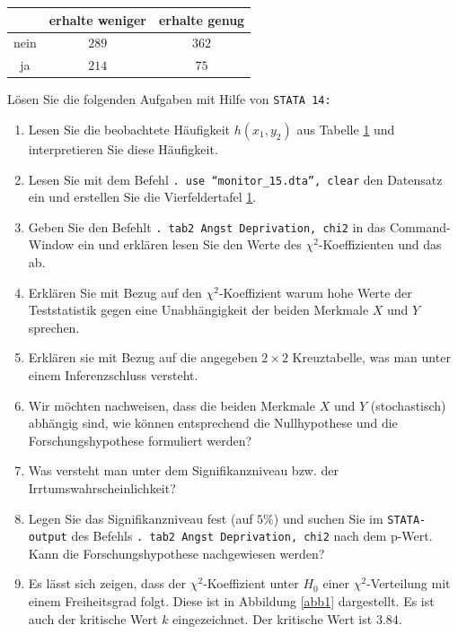 \documentclass[11pt]{article}
\begin{document}
\begin{enumerate}
\begin{table}[ht]
\begin{center}
\begin{tabular}{|c|c|c|}
	\hline %
             & erhalte weniger   & erhalte genug  \\ \hline
        nein & $289$  & $362$                  \\ \hline
          ja & $214$  & $75$        \\ \hline
\end{tabular}
\end{center}
\label{depri_angst}
\end{table}
Lösen Sie die folgenden Aufgaben mit Hilfe von  \texttt{STATA 14:}
\begin{enumerate}
\item{Lesen Sie die beobachtete Häufigkeit $h(x_{1},y_{2})$ aus Tabelle \ref{depri_angst}
und interpretieren Sie diese Häufigkeit.}
 \item {Lesen Sie mit dem Befehl \texttt{. use ``monitor\_15.dta'', clear} den Datensatz ein und erstellen  Sie die Vierfeldertafel \ref{depri_angst}.}
 \item{Geben Sie den Befehlt \texttt{. tab2 Angst Deprivation, chi2} in das Command-Window ein
 und erklären lesen Sie den Werte des $\chi^{2}$-Koeffizienten und das  ab.}
 \item{ Erklären Sie mit Bezug auf den $\chi^{2}$-Koeffizient warum hohe Werte
 der Teststatistik gegen eine Unabhängigkeit der beiden
 Merkmale $X$ und $Y$ sprechen.}
 \item{Erklären sie mit Bezug auf die angegeben $2 \times 2$ Kreuztabelle, was man unter einem Inferenzschluss versteht. }
 \item{Wir möchten nachweisen, dass die beiden Merkmale $X$ und $Y$ (stochastisch) abhängig sind, wie können entsprechend die Nullhypothese
 und die Forschungshypothese formuliert werden?}%
 \item{Was versteht man unter dem Signifikanzniveau bzw. der Irrtumswahrscheinlichkeit?}
 \item{Legen Sie das Signifikanzniveau fest (auf $5\%$) und suchen Sie im \texttt{STATA-output} des Befehls \texttt{. tab2 Angst Deprivation, chi2}
 nach dem p-Wert. Kann die Forschungshypothese nachgewiesen werden?}
 \item{Es lässt sich zeigen, dass der $\chi^{2}$-Koeffizient unter $H_{0}$ einer $\chi^{2}$-Verteilung mit einem Freiheitsgrad folgt. Diese ist in Abbildung
 \ref{abb1} dargestellt. Es ist auch der kritische Wert $k$ eingezeichnet. Der kritische Wert ist $3.84.$
 \begin{itemize}

\end{itemize}}
\end{enumerate}
\end{enumerate}
\end{document}
